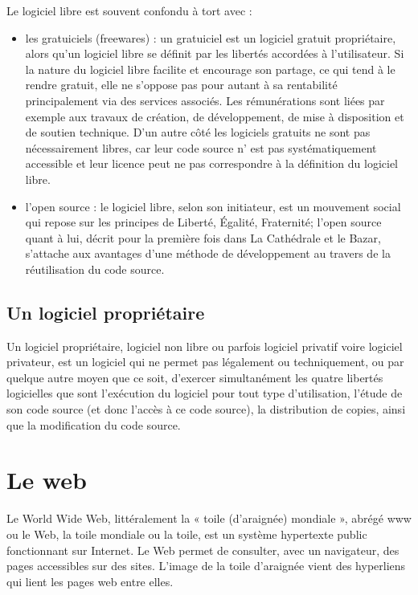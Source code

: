 Le logiciel libre est souvent confondu à tort avec :
\begin{itemize}
    \item les gratuiciels (freewares) : un gratuiciel est un logiciel gratuit propriétaire,
    alors qu'un logiciel libre se définit par les libertés accordées à l'utilisateur.
    Si la nature du logiciel libre facilite et encourage son partage, ce qui tend à
    le rendre gratuit, elle ne s'oppose pas pour autant à sa rentabilité principalement
    via des services associés. Les rémunérations sont liées par exemple aux travaux de
    création, de développement, de mise à disposition et de soutien technique. D'un autre
    côté les logiciels gratuits ne sont pas nécessairement libres, car leur code source n'
    est pas systématiquement accessible et leur licence peut ne pas correspondre à la
    définition du logiciel libre.
    \item l’open source : le logiciel libre, selon son initiateur, est un mouvement social qui
    repose sur les principes de Liberté, Égalité, Fraternité; l’open source quant à lui,
    décrit pour la première fois dans La Cathédrale et le Bazar, s'attache aux avantages
    d'une méthode de développement au travers de la réutilisation du code source.
\end{itemize}

\subsection{Un logiciel propriétaire}\label{subsec:logiciel-proprietaire}
Un logiciel propriétaire, logiciel non libre ou parfois logiciel privatif voire logiciel privateur,
est un logiciel qui ne permet pas légalement ou techniquement, ou par quelque autre moyen que ce soit,
d'exercer simultanément les quatre libertés logicielles que sont l'exécution du logiciel pour tout type
d'utilisation, l'étude de son code source (et donc l'accès à ce code source), la distribution de copies,
ainsi que la modification du code source.

\section{Le web}\label{subsec:web}
Le World Wide Web, littéralement la « toile (d’araignée) mondiale », abrégé www ou le Web, la toile mondiale ou la toile,
est un système hypertexte public fonctionnant sur Internet. Le Web permet de consulter,
avec un navigateur, des pages accessibles sur des sites. L’image de la toile d’araignée vient
des hyperliens qui lient les pages web entre elles.

